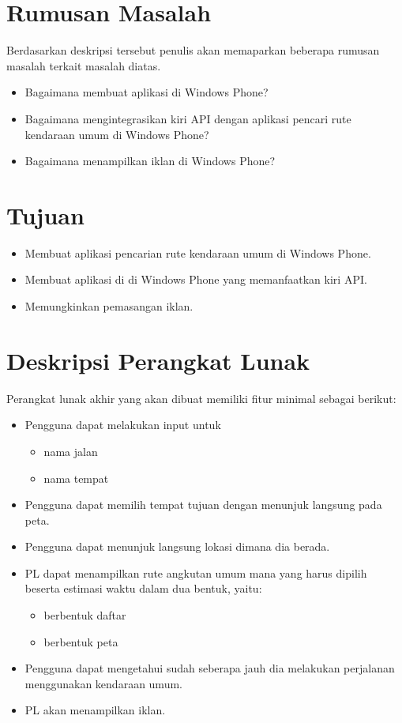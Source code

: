 \documentclass[a4paper,twoside]{article}
\begin{document}
\section{Rumusan Masalah}
Berdasarkan deskripsi tersebut penulis akan memaparkan beberapa rumusan masalah terkait masalah diatas.
\begin{itemize}
	\item Bagaimana membuat aplikasi di Windows Phone?
	\item Bagaimana mengintegrasikan kiri API dengan aplikasi pencari rute kendaraan umum di Windows Phone?
	\item Bagaimana menampilkan iklan di Windows Phone?
\end{itemize}

\section{Tujuan}
\begin{itemize}
	\item Membuat aplikasi pencarian rute kendaraan umum di Windows Phone.
	\item Membuat aplikasi di di Windows Phone yang memanfaatkan kiri API.
	\item Memungkinkan pemasangan iklan.
\end{itemize}
\section{Deskripsi Perangkat Lunak}
Perangkat lunak akhir yang akan dibuat memiliki fitur minimal sebagai berikut:
\begin{itemize}
	\item Pengguna dapat melakukan input untuk
	\begin{itemize}
		\item nama jalan
		\item nama tempat
	\end{itemize}
	\item Pengguna dapat memilih tempat tujuan dengan menunjuk langsung pada peta.
	\item Pengguna dapat menunjuk langsung lokasi dimana dia berada.
	\item PL dapat menampilkan rute angkutan umum mana yang harus dipilih beserta estimasi waktu dalam dua bentuk, yaitu:
	\begin{itemize}
		\item berbentuk daftar
		\item berbentuk peta
	\end{itemize}
	\item Pengguna dapat mengetahui sudah seberapa jauh dia melakukan perjalanan menggunakan kendaraan umum.
	\item PL akan menampilkan iklan.
\end{itemize}
\end{document}
